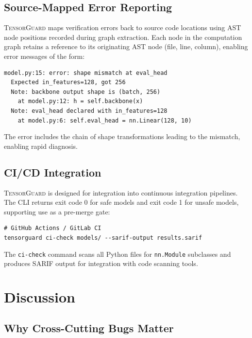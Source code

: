 \documentclass[10pt]{article}
\newcommand{\tguard}{\textsc{TensorGuard}}
\theoremstyle{plain}
\theoremstyle{definition}
\theoremstyle{remark}
\begin{document}
\subsection{Source-Mapped Error Reporting}

\tguard{} maps verification errors back to source code locations
using AST node positions recorded during graph extraction.  Each
node in the computation graph retains a reference to its originating
AST node (file, line, column), enabling error messages of the form:

\begin{lstlisting}[style=noline]
model.py:15: error: shape mismatch at eval_head
  Expected in_features=128, got 256
  Note: backbone output shape is (batch, 256)
    at model.py:12: h = self.backbone(x)
  Note: eval_head declared with in_features=128
    at model.py:6: self.eval_head = nn.Linear(128, 10)
\end{lstlisting}

\noindent
The error includes the chain of shape transformations leading to the
mismatch, enabling rapid diagnosis.

\subsection{CI/CD Integration}

\tguard{} is designed for integration into continuous integration
pipelines.  The CLI returns exit code 0 for safe models and exit
code 1 for unsafe models, supporting use as a pre-merge gate:

\begin{lstlisting}[style=noline]
# GitHub Actions / GitLab CI
tensorguard ci-check models/ --sarif-output results.sarif
\end{lstlisting}

The \texttt{ci-check} command scans all Python files for
\texttt{nn.Module} subclasses and produces SARIF output for
integration with code scanning tools.


\section{Discussion}\label{sec:discussion}

\subsection{Why Cross-Cutting Bugs Matter}
\end{document}
